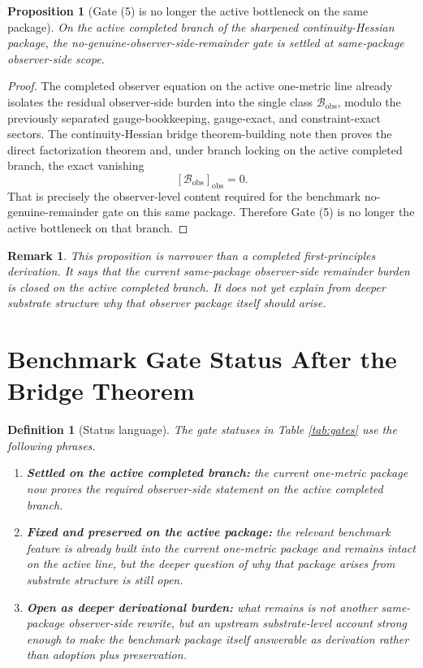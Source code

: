 \documentclass[11pt]{article}
\newcommand{\ObsBurden}{\mathcal{B}_{\mathrm{obs}}}
\newcommand{\ObserverClass}[1]{\left[#1\right]_{\mathrm{obs}}}
\newtheorem{definition}{Definition}
\newtheorem{proposition}{Proposition}
\newtheorem{remark}{Remark}
\begin{document}
\begin{proposition}[Gate (5) is no longer the active bottleneck on the same package]
On the active completed branch of the sharpened continuity-Hessian package, the no-genuine-observer-side-remainder gate is settled at same-package observer-side scope.
\end{proposition}

\begin{proof}
The completed observer equation on the active one-metric line already isolates the residual observer-side burden into the single class \(\ObsBurden\), modulo the previously separated gauge-bookkeeping, gauge-exact, and constraint-exact sectors. The continuity-Hessian bridge theorem-building note then proves the direct factorization theorem and, under branch locking on the active completed branch, the exact vanishing
\[
\ObserverClass{\ObsBurden}=0.
\]
That is precisely the observer-level content required for the benchmark no-genuine-remainder gate on this same package. Therefore Gate (5) is no longer the active bottleneck on that branch.
\end{proof}

\begin{remark}
This proposition is narrower than a completed first-principles derivation. It says that the current same-package observer-side remainder burden is closed on the active completed branch. It does not yet explain from deeper substrate structure why that observer package itself should arise.
\end{remark}

\section{Benchmark Gate Status After the Bridge Theorem}

\begin{definition}[Status language]
The gate statuses in Table \ref{tab:gates} use the following phrases.
\begin{enumerate}
    \item \textbf{Settled on the active completed branch:} the current one-metric package now proves the required observer-side statement on the active completed branch.
    \item \textbf{Fixed and preserved on the active package:} the relevant benchmark feature is already built into the current one-metric package and remains intact on the active line, but the deeper question of why that package arises from substrate structure is still open.
    \item \textbf{Open as deeper derivational burden:} what remains is not another same-package observer-side rewrite, but an upstream substrate-level account strong enough to make the benchmark package itself answerable as derivation rather than adoption plus preservation.
\end{enumerate}
\end{definition}
\end{document}
